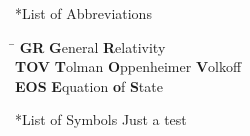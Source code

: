 \thispagestyle{empty}
\begin{section}*{List of Abbreviations}
\begin{tabbing}
\hspace{2cm}\= \kill
\textbf{GR} 		\> \textbf{G}eneral \textbf{R}elativity \\
\textbf{TOV}		\> \textbf {T}olman \textbf{O}ppenheimer \textbf{V}olkoff\\
\textbf{EOS}        \> \textbf{E}quation \textbf{o}f \textbf{S}tate

\end{tabbing}


\end{section}
\begin{section}*{List of Symbols}
	Just a test
\end{section}
